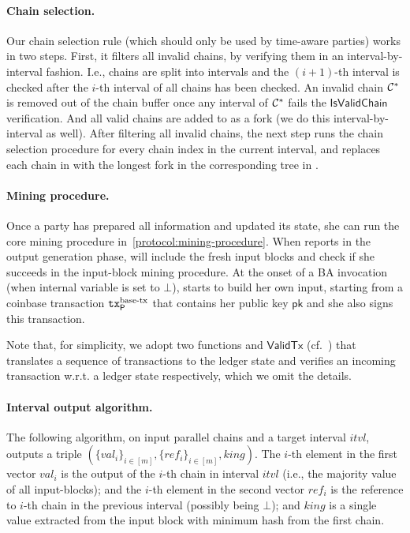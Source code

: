 \paragraph{Chain selection.}
%
Our chain selection rule (which should only be used by time-aware parties) works in two steps.
%
First, it filters all invalid chains, by verifying them in an interval-by-interval fashion.
%
I.e., chains are split into intervals and the $(i + 1)$-th interval is checked after the $i$-th interval of all chains has been checked.
%
An invalid chain $\mathcal{C}^*$ is removed out of the chain buffer once any interval of $\mathcal{C}^*$ fails the $\mathsf{IsValidChain}$ verification.
%
And all valid chains are added to \parallelTrees as a fork (we do this interval-by-interval as well).
%
After filtering all invalid chains, the next step runs the chain selection procedure for every chain index in the current interval, and replaces each chain in \parallelChains with the longest fork in the corresponding tree in \parallelTrees.



\paragraph{Mining procedure.}
%
Once a party \party has prepared all information and updated its state, she can run the core mining procedure in~\cref{protocol:mining-procedure}.
%
When \localTime reports in the output generation phase, \party will include the fresh input blocks and check if she succeeds in the input-block mining procedure.
%
At the onset of a BA invocation (when internal variable \val is set to $\bot$), \party starts to build her own input, starting from a coinbase transaction $\mathtt{tx}_\mathsf{P}^{\text{base-tx}}$ that contains her public key $\mathsf{pk}$ and she also signs this transaction.

Note that, for simplicity, we adopt two functions \blockify and $\mathsf{ValidTx}$ (cf.~\cite{C:BMTZ17}) that translates a sequence of transactions to the ledger state and verifies an incoming transaction w.r.t. a ledger state respectively, which we omit the details.



\paragraph{Interval output algorithm.}
%
The following algorithm, on input parallel chains \parallelChains and a target interval $itvl$, outputs a triple $(\{ val_i \}_{i \in [m]}, \{ ref_i \}_{i \in [m]}, king)$.
%
The $i$-th element in the first vector $val_i$ is the output of the $i$-th chain in interval $itvl$ (i.e., the majority value of all input-blocks); and the $i$-th element in the second vector $ref_i$ is the reference to $i$-th chain in the previous interval (possibly being $\bot$); and $king$ is a single value extracted from the input block with minimum hash from the first chain.

